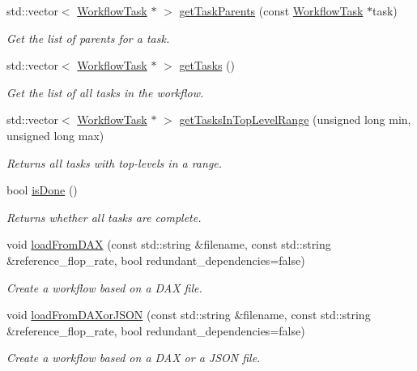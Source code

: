 \begin{DoxyCompactItemize}
std\+::vector$<$ \hyperlink{classwrench_1_1_workflow_task}{Workflow\+Task} $\ast$ $>$ \hyperlink{classwrench_1_1_workflow_af1e29741cd98e691cd2aba0038453176}{get\+Task\+Parents} (const \hyperlink{classwrench_1_1_workflow_task}{Workflow\+Task} $\ast$task)
\begin{DoxyCompactList}\small\item\em Get the list of parents for a task. \end{DoxyCompactList}\item 
std\+::vector$<$ \hyperlink{classwrench_1_1_workflow_task}{Workflow\+Task} $\ast$ $>$ \hyperlink{classwrench_1_1_workflow_abc742b44f0895ae2a42e60c63621f8aa}{get\+Tasks} ()
\begin{DoxyCompactList}\small\item\em Get the list of all tasks in the workflow. \end{DoxyCompactList}\item 
std\+::vector$<$ \hyperlink{classwrench_1_1_workflow_task}{Workflow\+Task} $\ast$ $>$ \hyperlink{classwrench_1_1_workflow_a7d8044bd686157c24b89c53810cb2b1b}{get\+Tasks\+In\+Top\+Level\+Range} (unsigned long min, unsigned long max)
\begin{DoxyCompactList}\small\item\em Returns all tasks with top-\/levels in a range. \end{DoxyCompactList}\item 
bool \hyperlink{classwrench_1_1_workflow_afc59b67119511acac649652d560f238a}{is\+Done} ()
\begin{DoxyCompactList}\small\item\em Returns whether all tasks are complete. \end{DoxyCompactList}\item 
void \hyperlink{classwrench_1_1_workflow_ac7048676d96d85a4f59580d4f77da935}{load\+From\+D\+AX} (const std\+::string \&filename, const std\+::string \&reference\+\_\+flop\+\_\+rate, bool redundant\+\_\+dependencies=false)
\begin{DoxyCompactList}\small\item\em Create a workflow based on a D\+AX file. \end{DoxyCompactList}\item 
void \hyperlink{classwrench_1_1_workflow_aac13e09401af73a566695502b559dda0}{load\+From\+D\+A\+Xor\+J\+S\+ON} (const std\+::string \&filename, const std\+::string \&reference\+\_\+flop\+\_\+rate, bool redundant\+\_\+dependencies=false)
\begin{DoxyCompactList}\small\item\em Create a workflow based on a D\+AX or a J\+S\+ON file. \end{DoxyCompactList}\item 

\end{DoxyCompactItemize}
